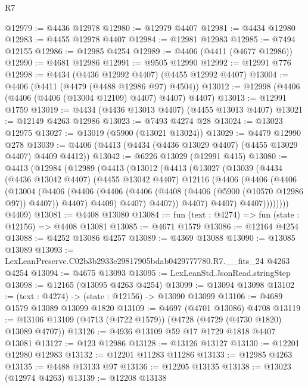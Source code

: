 \begin{lexlean}{R7}
\begin{coremodule}
@12979 := @4436 @12978
@12980 := @12979 @4407
@12981 := @4434 @12980
@12983 := @4455 @12978 @4407
@12984 := @12981 @12983
@12985 := @7494 @12155
@12986 := @12985 @4254
@12989 := @4406 (@4411 (@4677 @12986))
@12990 := @4681 @12986
@12991 := @9505 @12990
@12992 := @12991 @776
@12998 := @4434 (@4436 @12992 @4407) (@4455 @12992 @4407)
@13004 := @4406 (@4411 (@4479 (@4488 @12986 @97) @4504))
@13012 := @12998 (@4406 (@4406 (@4406 (@13004 @12109) @4407) @4407) @4407)
@13013 := @12991 @1759
@13019 := @4434 (@4436 @13013 @4407) (@4455 @13013 @4407)
@13021 := @12149 @4263 @12986
@13023 := @7493 @4274 @28
@13024 := @13023 @12975
@13027 := @13019 (@5900 (@13021 @13024))
@13029 := @4479 @12990 @278
@13039 := @4406 (@4413 (@4434 (@4436 @13029 @4407) (@4455 @13029 @4407) @4409 @4412))
@13042 := @6226 @13029 (@12991 @415)
@13080 := @4413
    (@12984
      (@12989
        (@4413
          (@13012
            (@4413
              (@13027
                (@13039
                  (@4434
                    (@4436 @13042 @4407)
                    (@4455 @13042 @4407)
                    @12116
                    (@4406
                      (@4406
                        (@4406
                          (@13004
                            (@4406
                              (@4406
                                (@4406
                                  (@4406 (@4408 (@4406 (@5900 (@10570 @12986 @97)) @4407)) @4407)
                                  @4409)
                                @4407)
                              @4407))
                          @4407)
                        @4407)
                      @4407))))))))
      @4409)
@13081 := @4408 @13080
@13084 := fun (text : @4274) => fun (state : @12156) => @4408 @13081
@13085 := @4671 @1579
@13086 := @12164 @4254
@13088 := @4252 @13086 @4257
@13089 := @4369 @13088
@13090 := @13085 @13089
@13093 := LexLeanPreserve.C02b3b2933e29817905bdab0429777780.R7.__fits_24 @4263 @4254
@13094 := @4675 @13093
@13095 := LexLeanStd.JsonRead.stringStep
@13098 := @12165 (@13095 @4263 @4254)
@13099 := @13094 @13098
@13102 := (text : @4274) -> (state : @12156) -> @13090 @13099
@13106 := @4689 @1579 @13089 @13099 @1820
@13109 := @4697 (@4701 @13086) @4708
@13119 := @13106 @13109 (@4713 (@4722 @1579)) (@4728 (@4729 (@4730 @1820) @13089 @4707))
@13126 := @4936 @13109 @59 @17 @1729 @1818 @4407 @13081
@13127 := @123 @12986
@13128 := @13126 @13127
@13130 := @12201 @12980 @12983
@13132 := @12201 @11283 @11286
@13133 := @12985 @4263
@13135 := @4488 @13133 @97
@13136 := @12205 @13135
@13138 := @13023 (@12974 @4263)
@13139 := @12208 @13138

\end{coremodule}
\end{lexlean}

